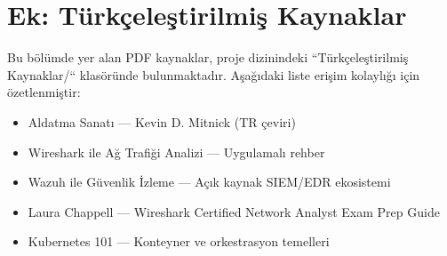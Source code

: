 \chapter*{Ek: Türkçeleştirilmiş Kaynaklar}

Bu bölümde yer alan PDF kaynaklar, proje dizinindeki ``Türkçeleştirilmiş Kaynaklar/`` klasöründe bulunmaktadır. Aşağıdaki liste erişim kolaylığı için özetlenmiştir:

\begin{itemize}
  \item Aldatma Sanatı — Kevin D. Mitnick (TR çeviri)
  \item Wireshark ile Ağ Trafiği Analizi — Uygulamalı rehber
  \item Wazuh ile Güvenlik İzleme — Açık kaynak SIEM/EDR ekosistemi
  \item Laura Chappell — Wireshark Certified Network Analyst Exam Prep Guide
  \item Kubernetes 101 — Konteyner ve orkestrasyon temelleri
\end{itemize}


